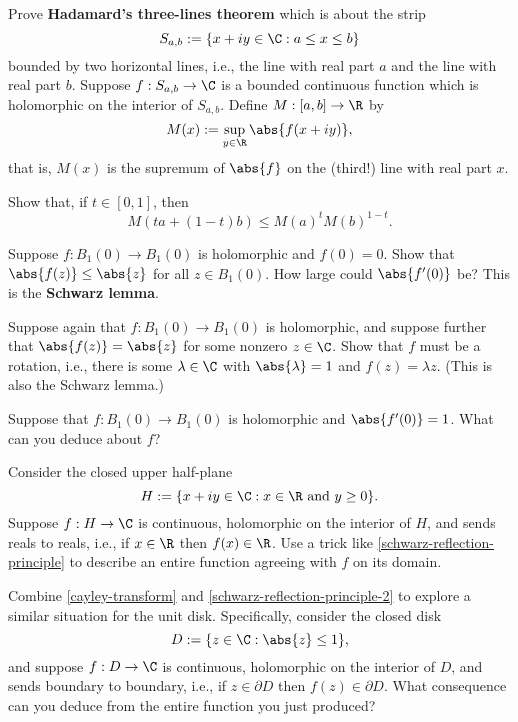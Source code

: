 \documentclass{homework}
\begin{document}
\begin{problem}\label{hadamard-three-lines}Prove \textbf{Hadamard's
    three-lines theorem} which is about the strip
  \[
    S_{a,b} := \{ x+iy \in \C : a \leq x \leq b\}
  \]
  bounded by two horizontal lines, i.e., the line with real part $a$
  and the line with real part $b$.  Suppose $f : S_{a,b} \to \C$ is a
  bounded continuous function which is holomorphic on the interior of
  $S_{a,b}$.  Define $M : [a,b] \to \R$ by
  \[
    M(x) := \sup_{y \in \R} \abs{f(x+iy)},
  \]
  that is, $M(x)$ is the supremum of $\abs{f}$ on the (third!) line with real part $x$.
  
  Show that, if $t \in [0,1]$, then \[
    M\left( ta + (1-t)b \right) \leq M(a)^t M(b)^{1-t}.
  \]
\end{problem}

\begin{problem}\label{schwarz-lemma}Suppose $f : B_1(0) \to B_1(0)$ is holomorphic and $f(0) = 0$.  Show
  that $\abs{f(z)} \leq \abs{z}$ for all $z \in B_1(0)$.  How large
  could $\abs{f'(0)}$ be?  This is the \textbf{Schwarz lemma}.
\end{problem}

\begin{problem}\label{schwarz-lemma-2}Suppose again that $f : B_1(0) \to B_1(0)$ is holomorphic, and
  suppose further that $\abs{f(z)} = \abs{z}$ for some nonzero
  $z \in \C$.  Show that $f$ must be a rotation, i.e., there is some
  $\lambda \in \C$ with $\abs{\lambda} = 1$ and $f(z) = \lambda z$.
  (This is also the Schwarz lemma.)
\end{problem}

\begin{problem}\label{schwarz-lemma-3}Suppose that
  $f : B_1(0) \to B_1(0)$ is holomorphic and $\abs{f'(0)} = 1$.  What
  can you deduce about $f$?
\end{problem}

\begin{problem}\label{schwarz-reflection-principle-2}Consider the
  closed upper half-plane
  \[
    H := \{ x + iy \in \C : x \in \R \mbox{ and } y \geq 0 \}.
  \]
  Suppose $f : H \to \C$ is continuous, holomorphic on the interior of
  $H$, and sends reals to reals, i.e., if $x \in \R$ then
  $f(x) \in \R$.  Use a trick like \ref{schwarz-reflection-principle}
  to describe an entire function agreeing with $f$ on its domain.
\end{problem}

\begin{problem}
  Combine \ref{cayley-transform} and
  \ref{schwarz-reflection-principle-2} to explore a similar situation
  for the unit disk.  Specifically, consider the closed disk
  \[
    D := \{ z \in \C : \abs{z} \leq 1 \},
  \]
  and suppose $f : D \to \C$ is continuous, holomorphic on the
  interior of $D$, and sends boundary to boundary, i.e., if
  $z \in \partial D$ then $f(z) \in \partial D$.  What consequence can
  you deduce from the entire function you just produced?
\end{problem}
\end{document}
